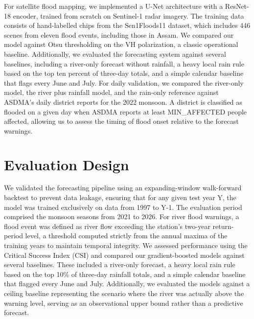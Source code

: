 \documentclass[conference]{IEEEtran}
\begin{document}
For satellite flood mapping, we implemented a U-Net architecture with a ResNet-18 encoder, trained from scratch on Sentinel-1 radar imagery. The training data consists of hand-labelled chips from the Sen1Floods11 dataset, which includes 446 scenes from eleven flood events, including those in Assam. We compared our model against Otsu thresholding on the VH polarization, a classic operational baseline. Additionally, we evaluated the forecasting system against several baselines, including a river-only forecast without rainfall, a heavy local rain rule based on the top ten percent of three-day totals, and a simple calendar baseline that flags every June and July. For daily validation, we compared the river-only model, the river plus rainfall model, and the rain-only reference against ASDMA's daily district reports for the 2022 monsoon. A district is classified as flooded on a given day when ASDMA reports at least MIN\_AFFECTED people affected, allowing us to assess the timing of flood onset relative to the forecast warnings.

\section{Evaluation Design}
We validated the forecasting pipeline using an expanding-window walk-forward backtest to prevent data leakage, ensuring that for any given test year Y, the model was trained exclusively on data from 1997 to Y-1. The evaluation period comprised the monsoon seasons from 2021 to 2026. For river flood warnings, a flood event was defined as river flow exceeding the station's two-year return-period level, a threshold computed strictly from the annual maxima of the training years to maintain temporal integrity. We assessed performance using the Critical Success Index (CSI) and compared our gradient-boosted models against several baselines. These included a river-only forecast, a heavy local rain rule based on the top 10\% of three-day rainfall totals, and a simple calendar baseline that flagged every June and July. Additionally, we evaluated the models against a ceiling baseline representing the scenario where the river was actually above the warning level, serving as an observational upper bound rather than a predictive forecast.
\end{document}
